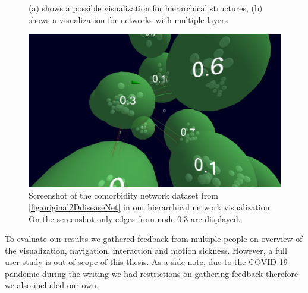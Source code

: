 \begin{figure}[h]
\begin{subfigure}[b]{0.50\columnwidth}
      \label{fig:2dmultilayerVis}
    \end{subfigure}
    \caption[Optional caption for the figure list (often used to abbreviate long captions)]{(a) shows a possible visualization for hierarchical structures, (b) shows a visualization for networks with multiple layers} %
    \label{fig:referenceVisualizations} 
  \end{figure}

\begin{figure}[h]
    \centering
    \includegraphics[width=1\textwidth]{graphics/conceptScreenshot.jpg}
    \caption{Screenshot of the comorbidity network dataset from \ref{fig:original2DdiseaseNet} in our hierarchical network visualization. On the screenshot only edges from node 0.3 are displayed.} %
    \label{fig:conceptSketch} 
\end{figure}

To evaluate our results we gathered feedback from multiple people on overview of the visualization, navigation, interaction and motion sickness. However, a full user study is out of scope of this thesis. As a side note, due to the COVID-19 pandemic during the writing we had restrictions on gathering feedback therefore we also included our own. 